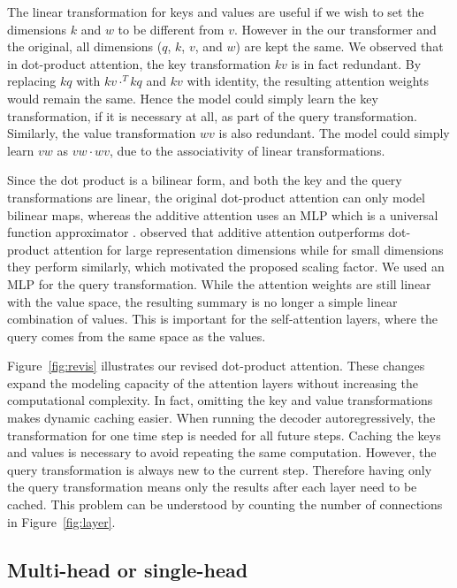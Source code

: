 \documentclass[11pt,twocolumn]{article}
\begin{document}
The linear transformation for keys and values are useful
if we wish to set the dimensions \(k\) and \(w\) to be different from \(v\).
However in the our transformer and the original,
all dimensions (\(q\), \(k\), \(v\), and \(w\)) are kept the same.
We observed that in dot-product attention,
the key transformation \(kv\) is in fact redundant.
By replacing \(kq\) with \(kv \cdot^{T} kq\) and \(kv\) with identity,
the resulting attention weights would remain the same.
Hence the model could simply learn the key transformation, if it is necessary at all,
as part of the query transformation.
Similarly, the value transformation \(wv\) is also redundant.
The model could simply learn \(vw\) as \(vw \cdot wv\),
due to the associativity of linear transformations.

Since the dot product is a bilinear form,
and both the key and the query transformations are linear,
the original dot-product attention can only model bilinear maps,
whereas the additive attention uses an MLP which is
a universal function approximator \parencite{hornik1989multilayer}.
\textcite{vaswani2017attention} observed that additive attention outperforms dot-product attention
for large representation dimensions while for small dimensions they perform similarly,
which motivated the proposed scaling factor.
We used an MLP for the query transformation.
While the attention weights are still linear with the value space,
the resulting summary is no longer a simple linear combination of values.
This is important for the self-attention layers,
where the query comes from the same space as the values.

Figure~\ref{fig:revis} illustrates our revised dot-product attention.
These changes expand the modeling capacity of the attention layers
without increasing the computational complexity.
In fact, omitting the key and value transformations makes dynamic caching easier.
When running the decoder autoregressively,
the transformation for one time step is needed for all future steps.
Caching the keys and values is necessary to avoid repeating the same computation.
However, the query transformation is always new to the current step.
Therefore having only the query transformation means only the results after each layer need to be cached.
This problem can be understood by counting the number of connections in Figure~\ref{fig:layer}.

\subsection{Multi-head or single-head}
\end{document}
